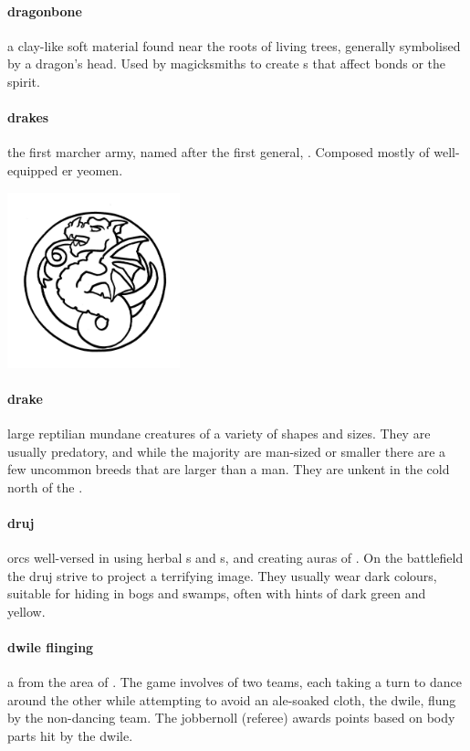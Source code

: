 \paragraph{dragonbone} a clay-like soft material found near the roots of living trees, generally symbolised by a dragon's head. Used by magicksmiths to create s that affect bonds or the spirit.
\paragraph{drakes} the first marcher army, named after the first general, . Composed mostly of well-equipped er yeomen.\begin{center}\includegraphics[width=5cm]{encyclopedia/Drakes}\end{center}
\paragraph{drake} large reptilian mundane creatures of a variety of shapes and sizes. They are usually predatory, and while the majority are man-sized or smaller there are a few uncommon breeds that are larger than a man. They are unkent in the cold north of the .
\paragraph{druj}  orcs well-versed in using herbal s and s, and creating auras of . On the battlefield the druj strive to project a terrifying image. They usually wear dark colours, suitable for hiding in bogs and swamps, often with hints of dark green and yellow.
\paragraph{dwile flinging} a  from the area of . The game involves of two teams, each taking a turn to dance around the other while attempting to avoid an ale-soaked cloth, the dwile, flung by the non-dancing team. The jobbernoll (referee) awards points based on body parts hit by the dwile.
